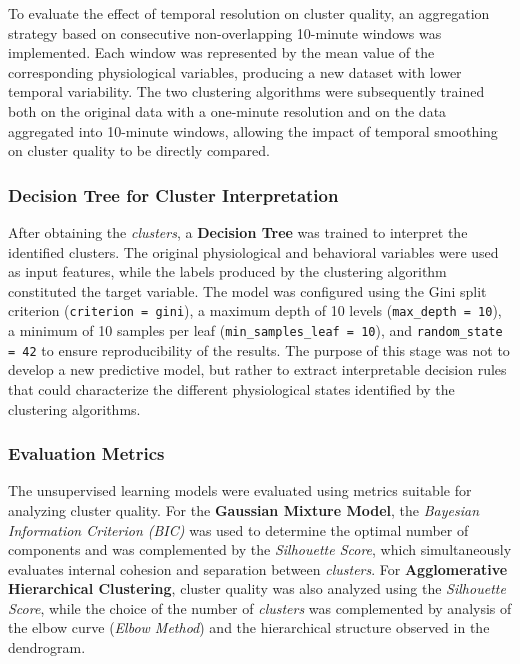 \documentclass[a4paper,fleqn]{cas-sc}
\begin{document}
To evaluate the effect of temporal resolution on cluster quality, an aggregation strategy based on consecutive non-overlapping 10-minute windows was implemented. Each window was represented by the mean value of the corresponding physiological variables, producing a new dataset with lower temporal variability. The two clustering algorithms were subsequently trained both on the original data with a one-minute resolution and on the data aggregated into 10-minute windows, allowing the impact of temporal smoothing on cluster quality to be directly compared.

\subsubsection{Decision Tree for Cluster Interpretation}

After obtaining the \textit{clusters}, a \textbf{Decision Tree} was trained to interpret the identified clusters. The original physiological and behavioral variables were used as input features, while the labels produced by the clustering algorithm constituted the target variable. The model was configured using the Gini split criterion (\texttt{criterion = gini}), a maximum depth of 10 levels (\texttt{max\_depth = 10}), a minimum of 10 samples per leaf (\texttt{min\_samples\_leaf = 10}), and \texttt{random\_state = 42} to ensure reproducibility of the results. The purpose of this stage was not to develop a new predictive model, but rather to extract interpretable decision rules that could characterize the different physiological states identified by the clustering algorithms.

\subsubsection{Evaluation Metrics}

The unsupervised learning models were evaluated using metrics suitable for analyzing cluster quality. For the \textbf{Gaussian Mixture Model}, the \textit{Bayesian Information Criterion (BIC)} was used to determine the optimal number of components and was complemented by the \textit{Silhouette Score}, which simultaneously evaluates internal cohesion and separation between \textit{clusters}. For \textbf{Agglomerative Hierarchical Clustering}, cluster quality was also analyzed using the \textit{Silhouette Score}, while the choice of the number of \textit{clusters} was complemented by analysis of the elbow curve (\textit{Elbow Method}) and the hierarchical structure observed in the dendrogram.
\end{document}
